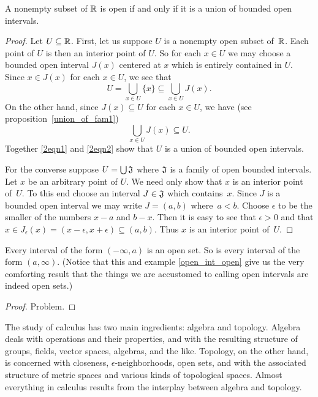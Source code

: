 \begin{prop}\label{union_open_intervals} A nonempty subset of $\mathbb{R}$ is open if and only if it is
a union of bounded open intervals.
\end{prop}

\begin{proof} Let $U \subseteq \mathbb{R}$. First, let us suppose $U$ is a nonempty open subset of~$\mathbb{R}$.
Each point of $U$ is then an interior point of $U$. So for each $x \in U$ we may choose a
bounded open interval $J(x)$ centered at $x$ which is entirely contained in $U$.  Since $x \in
J(x)$ for each $x \in U$, we see that
  \begin{equation}\label{2eqn1} U = \bigcup_{x \in U}\{x\} \subseteq
                \bigcup_{x \in U}J(x).
  \end{equation}
On the other hand, since $J(x) \subseteq U$ for each $x \in U$, we have (see
proposition~\ref{union_of_fam1})
  \begin{equation}\label{2eqn2} \bigcup_{x \in U} J(x) \subseteq U.
  \end{equation}
Together \eqref{2eqn1} and \eqref{2eqn2} show that $U$ is a union of bounded open intervals.

For the converse suppose $U = \bigcup \mathfrak{J}$ where $\mathfrak{J}$ is a family of open
bounded intervals.  Let $x$ be an arbitrary point of $U$.  We need only show that $x$ is
an interior point of~$U$. To this end choose an interval $J \in \mathfrak{J}$ which
contains~$x$. Since $J$ is a bounded open interval we may write $J = (a,b)$ where~$a <
b$.  Choose $\epsilon$ to be the smaller of the numbers $x - a$ and $b - x$.  Then it is
easy to see that $\epsilon > 0$ and that $x \in J_\epsilon(x) = (x - \epsilon, x +
\epsilon) \subseteq (a,b)$. Thus $x$ is an interior point of~$U$.
\end{proof}

\begin{exam}Every interval of the form $(-\infty,a)$ is an open set. So is every interval of
the form $(a,\infty)$. (Notice that this and example \ref{open_int_open} give us the very
comforting result that the things we are accustomed to calling open intervals are indeed open
sets.)
\end{exam}

\begin{proof} Problem. \ns \end{proof}

The study of calculus has two main ingredients: algebra and topology.  Algebra deals with
operations and their properties, and with the resulting structure of groups, fields, vector
spaces, algebras, and the like.  Topology, on the other hand, is concerned with closeness,
$\epsilon$-neighborhoods, open sets, and with the associated structure of metric spaces and
various kinds of topological spaces.  Almost everything in calculus results from the interplay
between algebra and topology.

